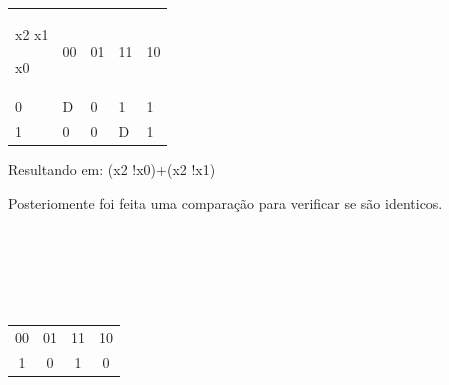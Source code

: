 \documentclass{article}
\begin{document}
\begin{table}[h]
 \centering
 {\renewcommand\arraystretch{1.25}
 \begin{tabular}{ l l l l l }
  \cline{1-1}\cline{2-2}\cline{3-3}\cline{4-4}\cline{5-5}  
    \multicolumn{1}{|p{1.300cm}|}{\begin{center}x2 x1
\end{center}  			


\begin{center}x0
\end{center}} &
    \multicolumn{1}{p{0.700cm}|}{00 \centering } &
    \multicolumn{1}{p{0.700cm}|}{01 \centering } &
    \multicolumn{1}{p{0.700cm}|}{11 \centering } &
    \multicolumn{1}{p{0.650cm}|}{10 \centering }
  \\  
  \cline{1-1}\cline{2-2}\cline{3-3}\cline{4-4}\cline{5-5}  
    \multicolumn{1}{|p{1.300cm}|}{0 \centering } &
    \multicolumn{1}{p{0.700cm}|}{D \centering } &
    \multicolumn{1}{p{0.700cm}|}{0 \centering } &
    \multicolumn{1}{p{0.700cm}|}{1 \centering } &
    \multicolumn{1}{p{0.650cm}|}{1 \centering }
  \\  
  \cline{1-1}\cline{2-2}\cline{3-3}\cline{4-4}\cline{5-5}  
    \multicolumn{1}{|p{1.300cm}|}{1 \centering } &
    \multicolumn{1}{p{0.700cm}|}{0 \centering } &
    \multicolumn{1}{p{0.700cm}|}{0 \centering } &
    \multicolumn{1}{p{0.700cm}|}{D \centering } &
    \multicolumn{1}{p{0.650cm}|}{1 \centering }
  \\  
  \hline

 \end{tabular} }
\end{table}

Resultando em: (x2 !x0)+(x2 !x1)

Posteriomente foi feita uma comparação para verificar se são identicos.
\\
\\
\\
\\
\\
\\

\begin{table}[h]
 \centering
 {\renewcommand\arraystretch{1.25}
 \begin{tabular}{ l l l l }
  \cline{1-1}\cline{2-2}\cline{3-3}\cline{4-4}  
    \multicolumn{1}{|c|}{00} &
    \multicolumn{1}{c|}{01} &
    \multicolumn{1}{c|}{11} &
    \multicolumn{1}{c|}{10}
  \\  
  \cline{1-1}\cline{2-2}\cline{3-3}\cline{4-4}  
    \multicolumn{1}{|c|}{1} &
    \multicolumn{1}{c|}{0} &
    \multicolumn{1}{c|}{1} &
    \multicolumn{1}{c|}{0}
  \\  
  \hline

 \end{tabular} }
\end{table}
\end{document}
